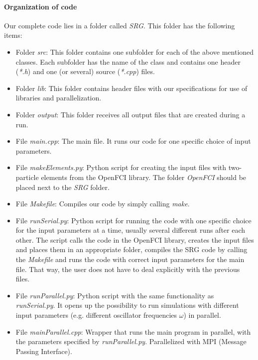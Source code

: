 \paragraph*{Organization of code}
Our complete code lies in a folder called \textit{SRG}. This folder has the following items:
\begin{itemize}
\item Folder \textit{src}: This folder contains one subfolder for each of the above mentioned classes. Each subfolder has the name of the class and contains one header (\textit{*.h}) and one (or several) source (\textit{*.cpp}) files. 
\item Folder \textit{lib}: This folder contains header files with our specifications for use of libraries and parallelization.
\item Folder \textit{output}: This folder receives all output files that are created during a run.
\item File \textit{main.cpp}: The main file. It runs our code for one specific choice of input parameters.
\item File \textit{makeElements.py}: Python script for creating the input files with  two-particle elements from the OpenFCI \cite{Kvaalcode} library. The folder \textit{OpenFCI} should be placed next to the \textit{SRG} folder.
\item File \textit{Makefile}: Compiles our code by simply calling \textit{make}. 
\item File \textit{runSerial.py}: Python script for running the code with one specific choice for the input parameters at a time, usually several different runs after each other. The script calls the code in the OpenFCI library, creates the input files and places them in an appropriate folder, compiles the SRG code by calling the \textit{Makefile} and runs the code with correct input parameters for the main file. That way, the user does not have to deal explicitly with the previous files.
\item File \textit{runParallel.py}: Python script with the same functionality as \textit{runSerial.py}. It opens up the possibility to run simulations with different input parameters (e.g. different oscillator frequencies $\omega$) in parallel. 
\item File \textit{mainParallel.cpp}:  Wrapper that runs the main program in parallel, with the parameters specified by \textit{runParallel.py}. Parallelized with MPI (Message Passing Interface).
\end{itemize}


